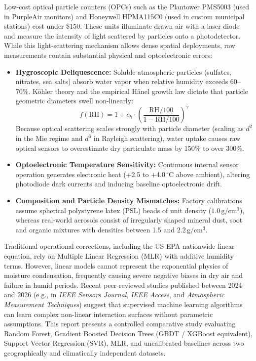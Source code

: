 \documentclass[11pt,a4paper]{article}
\begin{document}
Low-cost optical particle counters (OPCs) such as the Plantower PMS5003 (used in PurpleAir monitors) and Honeywell HPMA115C0 (used in custom municipal stations) cost under \$150. These units illuminate drawn air with a laser diode and measure the intensity of light scattered by particles onto a photodetector. While this light-scattering mechanism allows dense spatial deployments, raw measurements contain substantial physical and optoelectronic errors:
\begin{itemize}
    \item \textbf{Hygroscopic Deliquescence:} Soluble atmospheric particles (sulfates, nitrates, sea salts) absorb water vapor when relative humidity exceeds 60--70\%. K\"ohler theory and the empirical H\"anel growth law dictate that particle geometric diameters swell non-linearly:
    \begin{equation}
        f(\text{RH}) = 1 + c_h \cdot \left(\frac{\text{RH}/100}{1 - \text{RH}/100}\right)^\gamma
    \end{equation}
    Because optical scattering scales strongly with particle diameter (scaling as $d^2$ in the Mie regime and $d^6$ in Rayleigh scattering), water uptake causes raw optical sensors to overestimate dry particulate mass by 150\% to over 300\%.
    \item \textbf{Optoelectronic Temperature Sensitivity:} Continuous internal sensor operation generates electronic heat (+2.5 to +4.0\,$^\circ\text{C}$ above ambient), altering photodiode dark currents and inducing baseline optoelectronic drift.
    \item \textbf{Composition and Particle Density Mismatches:} Factory calibrations assume spherical polystyrene latex (PSL) beads of unit density ($1.0\,\text{g}/\text{cm}^3$), whereas real-world aerosols consist of irregularly shaped mineral dust, soot and organic mixtures with densities between 1.5 and 2.2\,$\text{g}/\text{cm}^3$.
\end{itemize}

Traditional operational corrections, including the US EPA nationwide linear equation, rely on Multiple Linear Regression (MLR) with additive humidity terms. However, linear models cannot represent the exponential physics of moisture condensation, frequently causing severe negative biases in dry air and failure in humid periods. Recent peer-reviewed studies published between 2024 and 2026 (e.g., in \textit{IEEE Sensors Journal}, \textit{IEEE Access}, and \textit{Atmospheric Measurement Techniques}) suggest that supervised machine learning algorithms can learn complex non-linear interaction surfaces without parametric assumptions. This report presents a controlled comparative study evaluating Random Forest, Gradient Boosted Decision Trees (GBDT / XGBoost equivalent), Support Vector Regression (SVR), MLR, and uncalibrated baselines across two geographically and climatically independent datasets.
\end{document}
